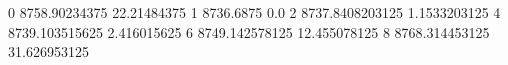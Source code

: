 0 8758.90234375 22.21484375
1 8736.6875 0.0
2 8737.8408203125 1.1533203125
4 8739.103515625 2.416015625
6 8749.142578125 12.455078125
8 8768.314453125 31.626953125
